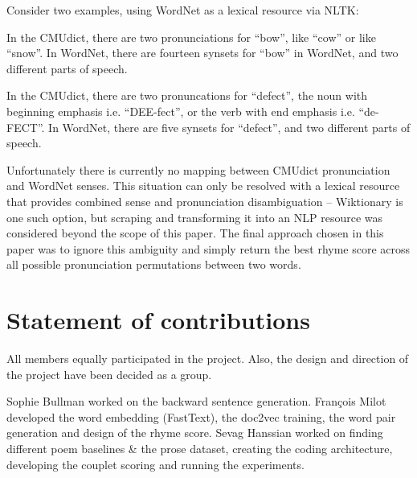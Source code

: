 \documentclass[11pt,a4paper]{article}
\newenvironment{tight_enumerate}{
\begin{enumerate}
\setlength{\itemsep}{0pt}
\setlength{\parskip}{0pt}
}{\end{enumerate}}
\begin{document}
Consider two examples, using WordNet \cite{wordnet} as a lexical resource via NLTK:
\begin{tight_enumerate}
	\vspace{-0.5em}
	\item
		In the CMUdict, there are two pronunciations for ``bow'', like ``cow'' or like ``snow''. In WordNet, there are fourteen synsets for ``bow'' in WordNet, and two different parts of speech.
	\item
		In the CMUdict, there are two pronuncations for ``defect'', the noun with beginning emphasis i.e. ``DEE-fect'', or the verb with end emphasis i.e. ``de-FECT''. In WordNet, there are five synsets for ``defect'', and two different parts of speech.
\end{tight_enumerate}

Unfortunately there is currently no mapping between CMUdict pronunciation and WordNet senses. This situation can only be resolved with a lexical resource that provides combined sense and pronunciation disambiguation -- Wiktionary \cite{wiktionary} is one such option, but scraping and transforming it into an NLP resource was considered beyond the scope of this paper. The final approach chosen in this paper was to ignore this ambiguity and simply return the best rhyme score across all possible pronunciation permutations between two words.

\section{Statement of contributions}
\label{sec:contributions}
All members equally participated in the project. Also, the design and direction of the project have been decided as a group. 

Sophie Bullman worked on the backward sentence generation. François Milot developed the word embedding (FastText), the doc2vec training, the word pair generation and design of the rhyme score. Sevag Hanssian worked on finding different poem baselines \& the prose dataset, creating the coding architecture, developing the couplet scoring and running the experiments.

\vfill
\clearpage



\end{document}
